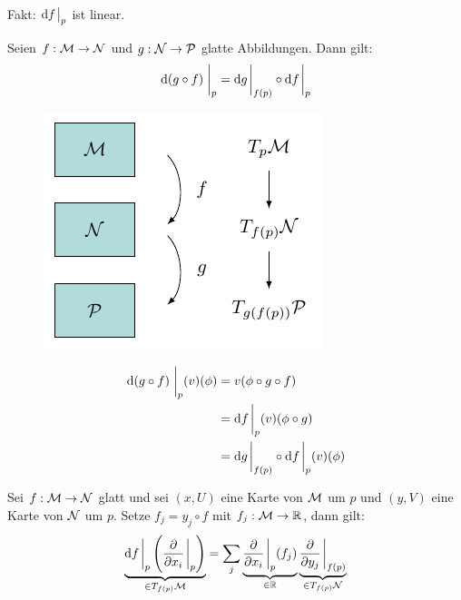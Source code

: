 Fakt: $\dd f \eval_p$ ist linear.
\begin{satz}[Kettenregel]
\label{satz:Kettenregel}
Seien $f: \mathcal{M} \to \mathcal{N}$ und $g: \mathcal{N} \to \mathcal{P}$ glatte Abbildungen.
Dann gilt:
\begin{align}
\dd (g \circ f) \eval_p = \dd g \eval_{f(p)} \circ \dd f \eval_p
\end{align}
\begin{figure}[H]
\centering
\includegraphics[width=0.45\linewidth]{figures/tikz/chain_rule.pdf}
\label{img:kettenregel}
\end{figure} 
\end{satz}

\begin{bew} \leavevmode
\begin{align*}
\dd (g \circ f) \eval_{p} (v) (\phi) &= v(\phi \circ g \circ f) \\
&= \dd f \eval_p (v)(\phi \circ g) \\
&= \dd g \eval_{f(p)} \circ \dd f \eval_p (v) (\phi)
\end{align*}
\end{bew}

\begin{satz}
Sei $f: \mathcal{M} \to \mathcal{N}$ glatt und sei $(x, U)$ eine Karte von $\mathcal{M}$ um $p$ und $(y, V)$ eine Karte von $\mathcal{N}$ um $p$.
Setze $f_j = y_j \circ f$ mit $f_j : \mathcal{M} \to \mathbb{R}$, dann gilt:
\begin{align}
    \underbrace{\dd f \eval_p \left( \pdv{x_i} \eval_p \right)}_{\in T_{f(p)}\mfk} = \sum_j \underbrace{\pdv{x_i}\eval_p (f_j)}_{\in \R} \underbrace{\pdv{y_j} \eval_{f(p)}}_{\in T_{f(p)}\mfka}
\end{align}
\end{satz}

